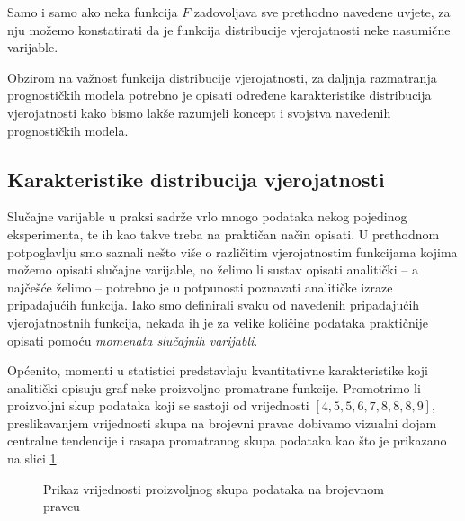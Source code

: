 \documentclass[a4paper,12pt,oneside]{memoir}
\begin{document}
                Samo i samo ako neka funkcija $F$ zadovoljava sve prethodno navedene uvjete, za nju možemo konstatirati da je funkcija distribucije vjerojatnosti neke nasumične varijable.
                
                Obzirom na važnost funkcija distribucije vjerojatnosti, za daljnja razmatranja prognostičkih modela potrebno je opisati određene karakteristike distribucija vjerojatnosti kako bismo lakše razumjeli koncept i svojstva navedenih prognostičkih modela.

            \subsection{Karakteristike distribucija vjerojatnosti}

                Slučajne varijable u praksi sadrže vrlo mnogo podataka nekog pojedinog eksperimenta, te ih kao takve treba na praktičan način opisati. U prethodnom potpoglavlju smo saznali nešto više o različitim vjerojatnostim funkcijama kojima možemo opisati slučajne varijable, no želimo li sustav opisati analitički -- a najčešće želimo -- potrebno je u potpunosti poznavati analitičke izraze pripadajućih funkcija. Iako smo definirali svaku od navedenih pripadajućih vjerojatnostnih funkcija, nekada ih je za velike količine podataka praktičnije opisati pomoću \textit{momenata slučajnih varijabli}.

                Općenito, momenti u statistici predstavlaju kvantitativne karakteristike koji analitički opisuju graf neke proizvoljno promatrane funkcije. Promotrimo li proizvoljni skup podataka koji se sastoji od vrijednosti $[4,5,5,6,7,8,8,8,9]$, preslikavanjem vrijednosti skupa na brojevni pravac dobivamo vizualni dojam centralne tendencije i rasapa promatranog skupa podataka kao što je prikazano na slici \ref{fig:45}.

                \begin{figure}[H]
                    \centering
                    \caption{Prikaz vrijednosti proizvoljnog skupa podataka na brojevnom pravcu}
                    \label{fig:45}
                \end{figure}
\end{document}
